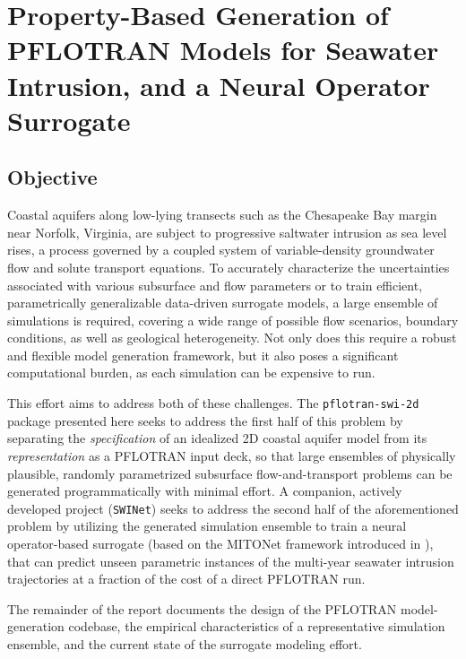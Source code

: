\section{Property-Based Generation of PFLOTRAN Models for Seawater Intrusion, and a Neural Operator Surrogate}
\label{sec:pflotran-swi}

\subsection{Objective}
\label{sec:objective}

Coastal aquifers along low-lying transects such as the Chesapeake Bay margin
near Norfolk, Virginia, are subject to progressive saltwater intrusion as sea
level rises, a process governed by a coupled system of variable-density 
groundwater flow and solute transport equations. To accurately characterize the 
uncertainties associated with various subsurface and flow parameters or to train
efficient, parametrically generalizable data-driven surrogate models, a large 
ensemble of simulations is required, covering a wide range of possible flow
scenarios, boundary conditions, as well as geological heterogeneity. Not only
does this require a robust and flexible model generation framework, but it also 
poses a significant computational burden, as each simulation can be expensive 
to run.

This effort aims to address both of these challenges. The \texttt{pflotran-swi-2d} package \citep{wu2026pflotranswi2d} presented here seeks to address the first half of this problem by separating the \emph{specification} of an idealized 2D coastal aquifer model from its \emph{representation} as a PFLOTRAN \citep{hammond2012pflotran} input deck, so that large ensembles of physically plausible, randomly parametrized subsurface flow-and-transport problems can be generated programmatically with minimal effort. A companion, actively developed project (\texttt{SWINet}) seeks to address the second half of the aforementioned problem by utilizing the generated simulation ensemble to train a neural operator-based surrogate (based on the MITONet framework introduced in \citet{riveracasillas2026mitonet}), that can predict unseen parametric instances of the multi-year seawater intrusion trajectories at a fraction of the cost of a direct PFLOTRAN run. 

The remainder of the report documents the design of the PFLOTRAN model-generation codebase, the empirical characteristics of a representative simulation ensemble, and the current state of the surrogate modeling effort.

